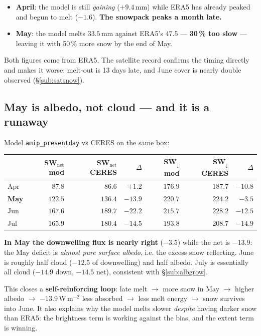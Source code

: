 \documentclass[10pt]{article}
\begin{document}
\begin{itemize}\itemsep2pt
\item \textbf{April}: the model is still \emph{gaining} ($+9.4$\,mm) while ERA5 has already
  peaked and begun to melt ($-1.6$). \textbf{The snowpack peaks a month late.}
\item \textbf{May}: the model melts $33.5$\,mm against ERA5's $47.5$ --- \textbf{30\,\% too
  slow} --- leaving it with 50\,\% more snow by the end of May.
\end{itemize}

\noindent Both figures come from ERA5. The satellite record confirms the timing directly
and makes it worse: melt-out is 13 days late, and June cover is nearly double observed
(\S\ref{sub:satsnow}).

\subsection{May is albedo, not cloud --- and it is a runaway}\label{sub:mayloop}
Model \texttt{amip\_presentday} vs CERES on the same box:

\begin{center}\footnotesize
\begin{tabular}{l r r r r r r}
\toprule
 & SW$_{\mathrm{net}}$ mod & SW$_{\mathrm{net}}$ CERES & $\Delta$ & SW$_\downarrow$ mod & SW$_\downarrow$ CERES & $\Delta$ \\
\midrule
Apr & $87.8$ & $86.6$ & $+1.2$ & $176.9$ & $187.7$ & $-10.8$ \\
\textbf{May} & $122.5$ & $136.4$ & $\mathbf{-13.9}$ & $220.7$ & $224.2$ & $\mathbf{-3.5}$ \\
Jun & $167.6$ & $189.7$ & $-22.2$ & $215.7$ & $228.2$ & $-12.5$ \\
Jul & $165.9$ & $180.4$ & $-14.5$ & $193.8$ & $208.7$ & $-14.9$ \\
\bottomrule
\end{tabular}
\end{center}

\noindent \textbf{In May the downwelling flux is nearly right} ($-3.5$) while the net is
$-13.9$: the May deficit is \emph{almost pure surface albedo}, i.e. the excess snow
reflecting. June is roughly half cloud ($-12.5$ of downwelling) and half albedo. July is
essentially all cloud ($-14.9$ down, $-14.5$ net), consistent with \S\ref{sub:albgrow}.

\noindent This closes a \textbf{self-reinforcing loop}: late melt $\to$ more snow in May
$\to$ higher albedo $\to$ $-13.9$\,W\,m$^{-2}$ less absorbed $\to$ less melt energy $\to$
snow survives into June. It also explains why the model melts slower \emph{despite} having
darker snow than ERA5: the brightness term is working against the bias, and the extent term
is winning.
\end{document}
